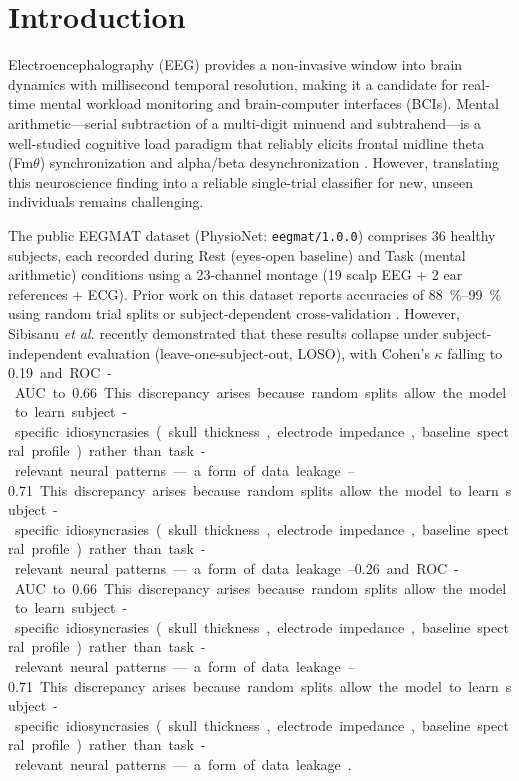\documentclass[conference]{IEEEtran}
\begin{document}
\section{Introduction}
Electroencephalography (EEG) provides a non-invasive window into brain dynamics with millisecond temporal resolution, making it a candidate for real-time mental workload monitoring and brain-computer interfaces (BCIs). Mental arithmetic—serial subtraction of a multi-digit minuend and subtrahend—is a well-studied cognitive load paradigm that reliably elicits frontal midline theta (Fm$\theta$) synchronization and alpha/beta desynchronization \cite{berka2007eeg, chikhi2022eeg, katahira2018eeg}. However, translating this neuroscience finding into a reliable single-trial classifier for new, unseen individuals remains challenging.

The public EEGMAT dataset \cite{zyma2019electroencephalograms} (PhysioNet: \texttt{eegmat/1.0.0}) comprises 36 healthy subjects, each recorded during Rest (eyes-open baseline) and Task (mental arithmetic) conditions using a 23-channel montage (19 scalp EEG + 2 ear references + ECG). Prior work on this dataset reports accuracies of \SI{88}{\%}--\SI{99}{\%} using random trial splits or subject-dependent cross-validation \cite{nath2020eeg, rambhia2023classification, aslam2025electroencephalograph}. However, Sibisanu \textit{et al.} \cite{sibisanu2026high} recently demonstrated that these results collapse under subject-independent evaluation (leave-one-subject-out, LOSO), with Cohen's $\kappa$ falling to \SIrange{0.19}{0.26} and ROC-AUC to \SIrange{0.66}{0.71}. This discrepancy arises because random splits allow the model to learn subject-specific idiosyncrasies (skull thickness, electrode impedance, baseline spectral profile) rather than task-relevant neural patterns—a form of data leakage \cite{pusica2025machine}.
\end{document}
